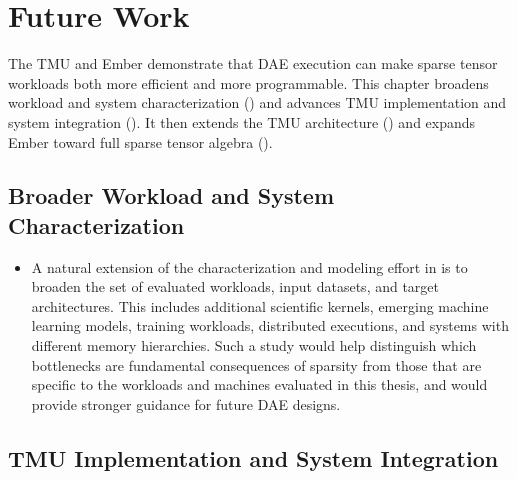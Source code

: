 \chapter{Future Work} \label{sec:future-work}

The TMU and Ember demonstrate that DAE execution can make sparse tensor workloads both more efficient and more programmable. This chapter broadens workload and system characterization () and advances TMU implementation and system integration (). It then extends the TMU architecture () and expands Ember toward full sparse tensor algebra ().

\section{Broader Workload and System Characterization} \label{sec:future-work-workload-system-characterization}

\begin{itemize}
    \item A natural extension of the characterization and modeling effort in  is to broaden the set of evaluated workloads, input datasets, and target architectures. This includes additional scientific kernels, emerging machine learning models, training workloads, distributed executions, and systems with different memory hierarchies. Such a study would help distinguish which bottlenecks are fundamental consequences of sparsity from those that are specific to the workloads and machines evaluated in this thesis, and would provide stronger guidance for future DAE designs.
\end{itemize}

\section{TMU Implementation and System Integration} \label{sec:future-work-tmu-implementation-integration}

